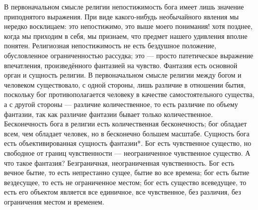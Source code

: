 \documentclass[12pt,oneside]{book}
\begin{document}
В первоначальном смысле религии непостижимость бога имеет лишь значение приподнятого выражения. При виде какого-нибудь необычайного явления мы нередко восклицаем: это непостижимо, это выше моего понимания! хотя позднее, когда мы приходим в себя, мы признаем, что предмет нашего удивления вполне понятен. Религиозная непостижимость не есть бездушное положение, обусловленное ограниченностью рассудка; это --- просто патетическое выражение впечатления, произведённого фантазией на чувство. Фантазия есть основной орган и сущность религии. В первоначальном смысле религии между богом и человеком существовало, с одной стороны, лишь различие в отношении бытия, поскольку бог противополагается человеку в качестве самостоятельного существа, а с другой стороны --- различие количественное, то есть различие по объему фантазии, так как различие фантазии бывает только количественное. Бесконечность бога в религии есть количественная бесконечность; бог обладает всем, чем обладает человек, но в бесконечно большем масштабе. Сущность бога есть объективированная сущность фантазии*\let\svthefootnote\thefootnote\let\thefootnote\relax{}\let\thefootnote\svthefootnote. Бог есть чувственное существо, но свободное от границ чувственности --- неограниченное чувственное существо. А что такое фантазия? Безграничная, неограниченная чувственность. Бог есть вечное бытие, то есть непрестанно сущее, бытие во все времена; бог есть бытие вездесущее, то есть не ограниченное местом; бог есть существо всеведущее, то есть его объектом является все единичное, все чувственное, без различия, без ограничения местом и временем.
\end{document}

